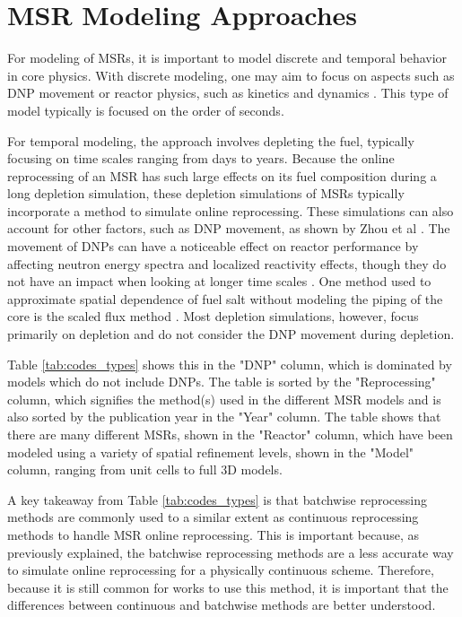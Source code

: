 \section{MSR Modeling Approaches}
\label{s:models-methods}

For modeling of MSRs, it is important to model discrete and temporal behavior in core physics.
With discrete modeling, one may aim to focus on aspects such as DNP movement \cite{fei_molten_2020, shi_gen-foam_2021} or reactor physics, such as kinetics and dynamics \cite{singh_plant-level_2020, cervi_development_2019, aufiero_development_2014, cui_development_2022, singh_dynamics_2017}.
This type of model typically is focused on the order of seconds.

For temporal modeling, the approach involves depleting the fuel, typically focusing on time scales ranging from days to years. Because the online reprocessing of an MSR has such large effects on its fuel composition during a long depletion simulation, these depletion simulations of MSRs typically incorporate a method to simulate online reprocessing.
These simulations can also account for other factors, such as DNP movement, as shown by Zhou et al \cite{zhou_fuel_2018}.
The movement of DNPs can have a noticeable effect on reactor performance by affecting neutron energy spectra and localized reactivity effects, though they do not have an impact when looking at longer time scales \cite{betzler_implementation_2017}.
One method used to approximate spatial dependence of fuel salt without modeling the piping of the core is the scaled flux method \cite{betzler_liquid-fueled_2021}.
Most depletion simulations, however, focus primarily on depletion and do not consider the DNP movement during depletion.

Table \ref{tab:codes_types} shows this in the "DNP" column, which is dominated by models which do not include DNPs.
The table is sorted by the "Reprocessing" column, which signifies the method(s) used in the different MSR models and is also sorted by the publication year in the "Year" column.
The table shows that there are many different MSRs, shown in the "Reactor" column, which have been modeled using a variety of spatial refinement levels, shown in the "Model" column, ranging from unit cells to full 3D models.

A key takeaway from Table \ref{tab:codes_types} is that batchwise reprocessing methods are commonly used to a similar extent as continuous reprocessing methods to handle MSR online reprocessing.
This is important because, as previously explained, the batchwise reprocessing methods are a less accurate way to simulate online reprocessing for a physically continuous scheme.
Therefore, because it is still common for works to use this method, it is important that the differences between continuous and batchwise methods are better understood.


